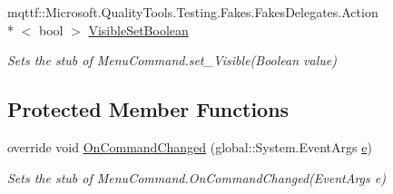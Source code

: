 \begin{DoxyCompactItemize}
mqttf\-::\-Microsoft.\-Quality\-Tools.\-Testing.\-Fakes.\-Fakes\-Delegates.\-Action\\*
$<$ bool $>$ \hyperlink{class_system_1_1_component_model_1_1_design_1_1_fakes_1_1_stub_menu_command_a2280f3fd2857a171397466d9759261d4}{Visible\-Set\-Boolean}
\begin{DoxyCompactList}\small\item\em Sets the stub of Menu\-Command.\-set\-\_\-\-Visible(\-Boolean value)\end{DoxyCompactList}\end{DoxyCompactItemize}
\subsection*{Protected Member Functions}
\begin{DoxyCompactItemize}
\item 
override void \hyperlink{class_system_1_1_component_model_1_1_design_1_1_fakes_1_1_stub_menu_command_a85b07c509f0941561e15b160e4f6c2eb}{On\-Command\-Changed} (global\-::\-System.\-Event\-Args \hyperlink{jquery-1_810_82_8min_8js_a2c038346d47955cbe2cb91e338edd7e1}{e})
\begin{DoxyCompactList}\small\item\em Sets the stub of Menu\-Command.\-On\-Command\-Changed(\-Event\-Args e)\end{DoxyCompactList}\end{DoxyCompactItemize}
